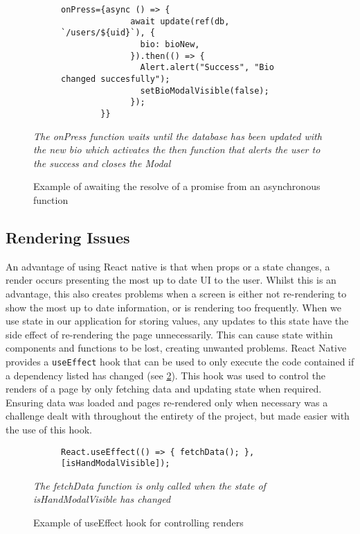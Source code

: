 \begin{figure}[!htbp]
    \centering
    \begin{subfigure}[b]{0.8\textwidth}
        \begin{lstlisting}[language=jsJsx]
        onPress={async () => {
              await update(ref(db, `/users/${uid}`), {
                bio: bioNew,
              }).then(() => {
                Alert.alert("Success", "Bio changed succesfully");
                setBioModalVisible(false);
              });
        }}
        \end{lstlisting}
    \end{subfigure}
\caption{Example of awaiting the resolve of a promise from an asynchronous function}
\small\textit{The onPress function waits until the database has been updated with the new bio which activates the then function that alerts the user to the success and closes the Modal}
\label{fig:asyncAwait}
\end{figure}
\FloatBarrier

\subsection*{Rendering Issues}
An advantage of using React native is that when props or a state changes, a render occurs presenting the most up to date UI to the user. Whilst this is an advantage, this also creates problems when a screen is either not re-rendering to show the most up to date information, or is rendering too frequently. When we use state in our application for storing values, any updates to this state have the side effect of re-rendering the page unnecessarily. This can cause state within components and functions to be lost, creating unwanted problems. React Native provides a \texttt{useEffect} hook that can be used to only execute the code contained if a dependency listed has changed (see \ref{fig:useEffect}). This hook was used to control the renders of a page by only fetching data and updating state when required. Ensuring data was loaded and pages re-rendered only when necessary was a challenge dealt with throughout the entirety of the project, but made easier with the use of this hook.
\begin{figure}[!htbp]
    \centering
    \begin{subfigure}[b]{0.8\textwidth}
        \begin{lstlisting}[language=jsJsx]
        React.useEffect(() => { fetchData(); }, [isHandModalVisible]);
        \end{lstlisting}
    \end{subfigure}
\caption{Example of useEffect hook for controlling renders}
\small\textit{The fetchData function is only called when the state of isHandModalVisible has changed}
\label{fig:useEffect}
\end{figure}
\FloatBarrier

